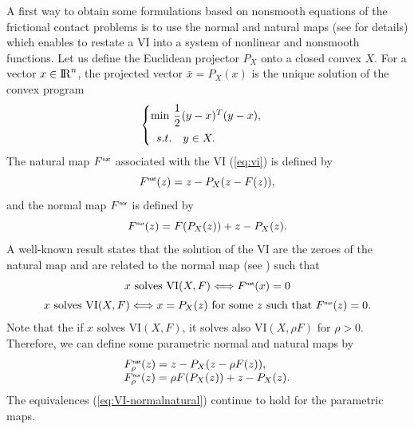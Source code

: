 A first way to obtain some formulations based on nonsmooth equations of the frictional contact problems is to use the normal and natural maps (see \cite{Facchinei.Pang2003} for details) which enables to restate a VI into a system of nonlinear and  nonsmooth functions.  Let us define the Euclidean projector $P_X$ onto a closed convex $X$. For a vector $x\in \mathrm{I\!R}^n$, the projected vector $\bar x  = P_X(x)$ is the unique solution of the convex program
\begin{equation}
  \label{eq:opt-proj}
  \begin{cases}
    \min\, \Frac 1 2 (y-x)^T(y-x), \\[2mm]
    \begin{array}{ll}
    s.t. & y \in X .
  \end{array}
  \end{cases}
\end{equation}
 The natural map $F^{\hbox{\sf \tiny{nat}}}$ associated with the VI (\ref{eq:vi}) is defined by
\begin{equation}
  \label{eq:naturalmap}
  F^\nat(z) = z - P_{X}(z-F(z)),
\end{equation}
and  the normal map $F^{\hbox{\sf \tiny{nor}}}$ is defined by
\begin{equation}
  \label{eq:normalmap}
  F^\nor(z) = F(P_X(z)) + z - P_{X}(z).
\end{equation}
A well-known result states that the solution of the VI are  the zeroes of the natural map and are related to the normal map (see \cite{Facchinei.Pang2003}) such that
\begin{equation}
  \label{eq:VI-normalnatural}
  \begin{array}{c}
  x \text{ solves } \mathrm{VI}(X,F) \Longleftrightarrow  F^\nat(x)=0 \\[2mm]
  x \text{ solves } \mathrm{VI}(X,F) \Longleftrightarrow x= P_X(z) \text{ for some } z \text{ such that } F^\nor(z)=0.
\end{array}
\end{equation}
Note that the if $x$ solves  $\mathrm{VI}(X,F)$, it solves also  $\mathrm{VI}(X,\rho F)$ for $\rho > 0$. Therefore, we can define some parametric normal and natural maps by
\begin{equation}
  \label{eq:parametrized-naturalnormalmap}
  \begin{array}{l}
    F_\rho^\nat(z) = z - P_{X}(z-\rho F(z)), \\
    F_\rho^\nor(z) = \rho F(P_X(z)) + z - P_{X}(z).
  \end{array}
\end{equation}
The equivalences (\ref{eq:VI-normalnatural}) continue to hold for the parametric maps. 
 

